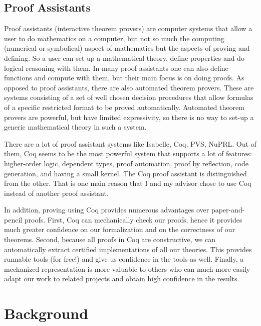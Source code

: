 \section {Proof Assistants}
Proof assistants (interactive theorem provers) are computer systems that allow a user to do mathematics on a computer, but not so much the computing (numerical or symbolical) aspect of mathematics but the aspects of proving and defining. So a user can set up a mathematical theory, define properties and do logical reasoning with them. In many proof assistants one can also define functions and compute with them, but their main focus is on doing proofs. As opposed to proof assistants, there are also automated theorem provers. These are systems consisting of a set of well chosen decision procedures that allow formulas of a specific restricted format to be proved automatically. Automated theorem provers are powerful, but have limited expressivity, so there is no way to set-up a generic mathematical theory in such a system.

There are a lot of proof assistant systems like Isabelle, Coq, PVS, NuPRL. Out of them, Coq seems to be the most powerful system that supports a lot of features: higher-order logic, dependent types, proof automation, proof by reflection, code generation, and having a small kernel. The Coq proof assistant is distinguished from the other. That is one main reason that I and my advisor chose to use Coq instead of another proof assistant.

In addition, proving using Coq provides numerous advantages over paper-and-pencil proofs. First, Coq can mechanically check our proofs, hence it provides much greater confidence on our formalization and on the correctness of our theorems. Second, because all proofs in Coq are constructive, we can automatically extract certified implementations of all our theories. This provides runnable tools (for free!) and give us confidence in the tools as well. Finally, a mechanized representation is more valuable to others who can much more easily
adapt our work to related projects and obtain high confidence in the results.


\chapter{Background}

